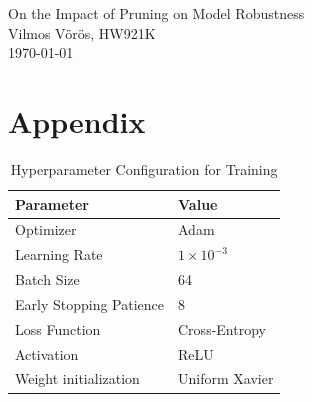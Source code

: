 \documentclass[12pt]{article}
\begin{document}
\pagestyle{fancy}

\begin{titlepage} 
    \centering
    \vspace*{\fill}
    
    {\large On the Impact of Pruning on Model Robustness} \\[2cm]
    {Vilmos Vörös, HW921K} \\[1cm]
    {\today}

    \vspace*{\fill}

\end{titlepage} 

\tableofcontents

\pagebreak














\appendix
\section{Appendix}\label{sec:appendix}
\begin{table}[h]
\centering
\caption{Hyperparameter Configuration for Training}
\label{tab:training_params}
\begin{tabular}{ll}
\toprule
\textbf{Parameter} & \textbf{Value} \\
\midrule
Optimizer & Adam \\
Learning Rate & $1 \times 10^{-3}$ \\
Batch Size & 64 \\
Early Stopping Patience & 8 \\
Loss Function & Cross-Entropy \\
Activation & ReLU \\
Weight initialization & Uniform Xavier \\
\bottomrule
\end{tabular}
\end{table}
\end{document}
